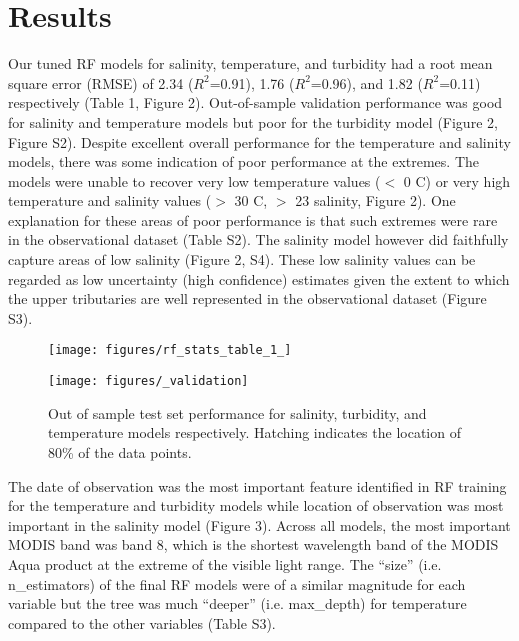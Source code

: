 \documentclass{article}
\begin{document}
\section{Results}

Our tuned RF models for salinity, temperature, and turbidity had a root mean square error (RMSE) of 2.34 ($R^2$=0.91), 1.76 ($R^2$=0.96), and 1.82 ($R^2$=0.11) respectively (Table 1, Figure 2). Out-of-sample validation performance was good for salinity and temperature models but poor for the turbidity model (Figure 2, Figure S2). Despite excellent overall performance for the temperature and salinity models, there was some indication of poor performance at the extremes. The models were unable to recover very low temperature values ($<$ 0 C) or very high temperature and salinity values ($>$ 30 C, $>$ 23 salinity, Figure 2). One explanation for these areas of poor performance is that such extremes were rare in the observational dataset (Table S2). The salinity model however did faithfully capture areas of low salinity (Figure 2, S4). These low salinity values can be regarded as low uncertainty (high confidence) estimates given the extent to which the upper tributaries are well represented in the observational dataset (Figure S3).

\begin{figure}[ht!]
    \begin{center}
          \texttt{[image: figures/rf\_stats\_table\_1\_]}          
    \end{center}    
\end{figure}

\begin{figure}[ht!]
    \begin{center}
          \texttt{[image: figures/\_validation]}
          \caption{Out of sample test set performance for salinity, turbidity, and temperature models respectively. Hatching indicates the location of 80\% of the data points.}
    \end{center}
\end{figure}

The date of observation was the most important feature identified in RF training for the temperature and turbidity models while location of observation was most important in the salinity model (Figure 3). Across all models, the most important MODIS band was band 8, which is the shortest wavelength band of the MODIS Aqua product at the extreme of the visible light range. The “size” (i.e. n\_estimators) of the final RF models were of a similar magnitude for each variable but the tree was much “deeper” (i.e. max\_depth) for temperature compared to the other variables (Table S3).
\end{document}

